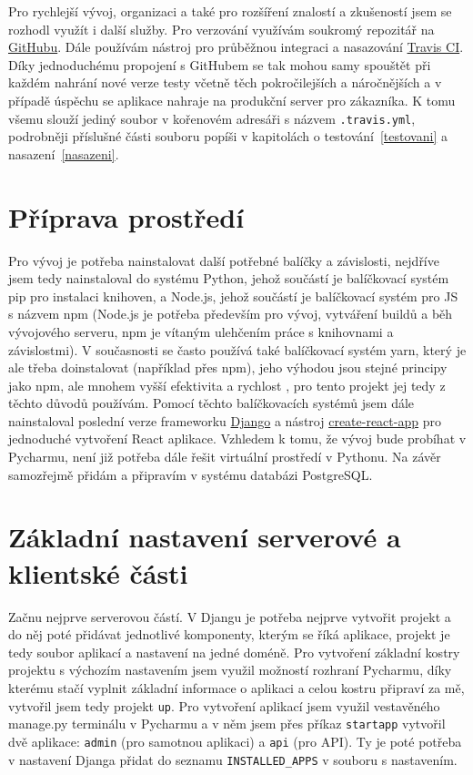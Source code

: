     Pro rychlejší vývoj, organizaci a také pro rozšíření znalostí a zkušeností jsem se rozhodl využít i další služby. Pro verzování využívám soukromý repozitář na \href{https://github.com/}{GitHubu}. Dále používám nástroj pro průběžnou integraci a nasazování \href{https://travis-ci.com/}{Travis CI}. Díky jednoduchému propojení s GitHubem se tak mohou samy spouštět při každém nahrání nové verze testy včetně těch pokročilejších a náročnějších a v případě úspěchu se aplikace nahraje na produkční server pro zákazníka. K tomu všemu slouží jediný soubor v kořenovém adresáři s názvem \verb|.travis.yml|, podrobněji příslušné části souboru popíši v kapitolách o testování~\ref{testovani} a nasazení~\ref{nasazeni}.
    
    \section{Příprava prostředí}
    Pro vývoj je potřeba nainstalovat další potřebné balíčky a závislosti, nejdříve jsem tedy nainstaloval do systému Python, jehož součástí je balíčkovací systém pip pro instalaci knihoven, a Node.js, jehož součástí je balíčkovací systém pro JS s názvem npm (Node.js je potřeba především pro vývoj, vytváření buildů a běh vývojového serveru, npm je vítaným ulehčením práce s knihovnami a závislostmi). V současnosti se často používá také balíčkovací systém yarn, který je ale třeba doinstalovat (například přes npm), jeho výhodou jsou stejné principy jako npm, ale mnohem vyšší efektivita a rychlost \cite{yarn}, pro tento projekt jej tedy z těchto důvodů používám. Pomocí těchto balíčkovacích systémů jsem dále nainstaloval poslední verze frameworku \href{https://www.djangoproject.com/}{Django} a nástroj \href{https://github.com/facebook/create-react-app}{create-react-app} pro jednoduché vytvoření React aplikace. Vzhledem k tomu, že vývoj bude probíhat v Pycharmu, není již potřeba dále řešit virtuální prostředí v Pythonu. Na závěr samozřejmě přidám a připravím v systému databázi PostgreSQL.
    
    \section{Základní nastavení serverové a klientské části}\label{zakladninastaveni}
    Začnu nejprve serverovou částí. V Djangu je potřeba nejprve vytvořit projekt a do něj poté přidávat jednotlivé komponenty, kterým se říká aplikace, projekt je tedy soubor aplikací a nastavení na jedné doméně. Pro vytvoření základní kostry projektu s výchozím nastavením jsem využil možností rozhraní Pycharmu, díky kterému stačí vyplnit základní informace o aplikaci a celou kostru připraví za mě, vytvořil jsem tedy projekt \verb|up|. Pro vytvoření aplikací jsem využil vestavěného manage.py terminálu v Pycharmu a v něm jsem přes příkaz \verb|startapp| vytvořil dvě aplikace: \verb|admin| (pro samotnou aplikaci) a \verb|api| (pro API). Ty je poté potřeba v nastavení Djanga přidat do seznamu \verb|INSTALLED_APPS| v souboru s nastavením.
    
